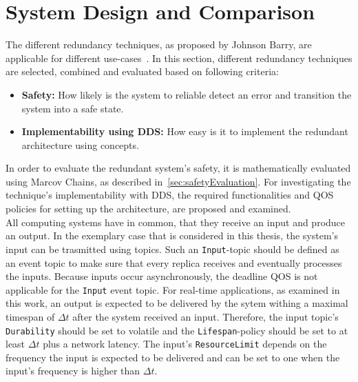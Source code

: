 
\section{System Design and Comparison}
The different redundancy techniques, as proposed by Johnson Barry, are applicable for different use-cases~\cite{BarryFaultToleranceAnalysis}.
In this section, different redundancy techniques are selected, combined and evaluated based on following criteria:

\begin{itemize}
\item \textbf{Safety:} How likely is the system to reliable detect an error and transition the system into a safe state.
\item \textbf{Implementability using \gls*{DDS}:} How easy is it to implement the redundant architecture using  concepts.
\end{itemize}

In order to evaluate the redundant system's safety, it is mathematically evaluated using Marcov Chains, as described in~\autoref{sec:safetyEvaluation}.
For investigating the technique's implementability with \gls*{DDS}, the required functionalities and \gls*{QOS} policies for setting up the architecture, are proposed and examined.
\\

All computing systems have in common, that they receive an input and produce an output.
In the exemplary case that is considered in this thesis, the system's input can be trasmitted using  topics.
Such an \texttt{Input}-topic should be defined as an event topic to make sure that every replica receives and eventually processes the inputs.
Because inputs occur asynchronously, the deadline \gls*{QOS} is not applicable for the \texttt{Input} event topic.
For real-time applications, as examined in this work, an output is expected to be delivered by the sytem withing a maximal timespan of $\Delta t$ after the system received an input.
Therefore, the input topic's \texttt{Durability} should be set to volatile and the \texttt{Lifespan}-policy should be set to at least $\Delta t$ plus a network latency.
The input's \texttt{ResourceLimit} depends on the frequency the input is expected to be delivered and can be set to one when the input's frequency is higher than $\Delta t$.
\\

